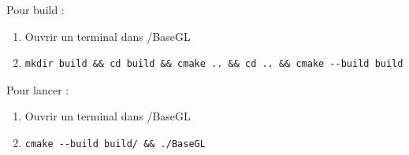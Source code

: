 \documentclass{article}
\begin{document}
Pour build :
\begin{enumerate}
    \item Ouvrir un terminal dans /BaseGL
    \item 
        \begin{verbatim}
mkdir build && cd build && cmake .. && cd .. && cmake --build build
        \end{verbatim}
\end{enumerate}

Pour lancer :
\begin{enumerate}
    \item Ouvrir un terminal dans /BaseGL
    \item 
        \begin{verbatim}
cmake --build build/ && ./BaseGL
        \end{verbatim} 
\end{enumerate}
\end{document}
